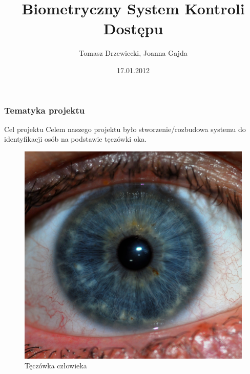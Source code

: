 \documentclass{beamer}
\title[Biometryczny System Kontroli Dostępu]{Biometryczny System Kontroli Dostępu}
\author[T. Drzewiecki, J. Gajda]{Tomasz Drzewiecki, Joanna Gajda}
\date[2012]{17.01.2012}
\institute[AGH-UST]
{Wydział Elektrotechniki, Automatyki, Informatyki i Elektroniki\\ 
Katedra Automatyki
}
\begin{document}
{
 \begin{frame}
   \titlepage
 \end{frame}
}


\begin{frame}
\frametitle{Tematyka projektu}

\begin{block}{Cel projektu}
Celem naszego projektu było stworzenie/rozbudowa systemu do identyfikacji osób na podstawie tęczówki oka.
\end{block}

\begin{figure}
\begin{center}
\includegraphics[scale=0.04]{teczowka.jpg}
\caption{Tęczówka człowieka}
\end{center}
\end{figure}

\end{frame}
\end{document}
